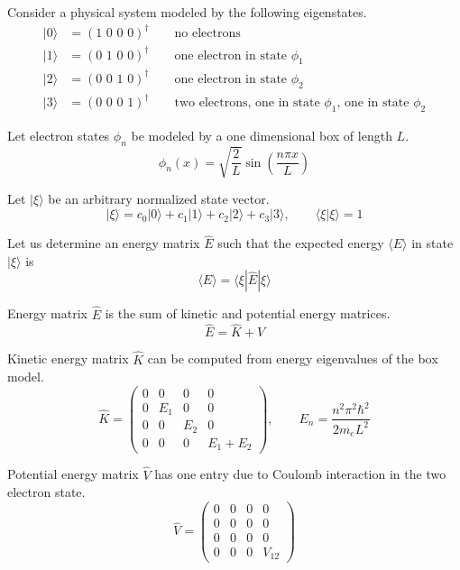 \documentclass[12pt]{article}
\begin{document}
\noindent
Consider a physical system modeled by the following eigenstates.
\begin{align*}
|0\rangle&=(\text{1 0 0 0})^\dag\qquad\text{no electrons}\\
|1\rangle&=(\text{0 1 0 0})^\dag\qquad\text{one electron in state $\phi_1$}\\
|2\rangle&=(\text{0 0 1 0})^\dag\qquad\text{one electron in state $\phi_2$}\\
|3\rangle&=(\text{0 0 0 1})^\dag\qquad\text{two electrons, one in state $\phi_1$, one in state $\phi_2$}
\end{align*}

\noindent
Let electron states $\phi_n$ be modeled by a one dimensional box of length $L$.
\begin{equation*}
\phi_n(x)=\sqrt{\frac{2}{L}}\sin\left(\frac{n\pi x}{L}\right)
\end{equation*}

\noindent
Let $|\xi\rangle$ be an arbitrary normalized state vector.
\begin{equation*}
|\xi\rangle=c_0|0\rangle+c_1|1\rangle+c_2|2\rangle+c_3|3\rangle,\qquad\langle\xi|\xi\rangle=1
\end{equation*}

\noindent
Let us determine an energy matrix $\hat{E}$ such that the expected
energy $\langle E \rangle$ in state $|\xi\rangle$ is
\begin{equation*}
\langle E\rangle=\langle\xi|\hat{E}|\xi\rangle
\end{equation*}

\noindent
Energy matrix $\hat{E}$ is the sum of kinetic and potential energy matrices.
\begin{equation*}
\hat{E}=\hat{K}+\hat{V}
\end{equation*}

\noindent
Kinetic energy matrix $\hat{K}$ can be computed from energy eigenvalues of the box model.
\begin{equation*}
\hat{K}=\begin{pmatrix}
0 & 0 & 0 & 0\\
0 & E_1 & 0 & 0\\
0 & 0 & E_2 & 0\\
0 & 0 & 0 & E_1+E_2
\end{pmatrix},
\qquad
E_n=\frac{n^2\pi^2\hbar^2}{2m_eL^2}
\end{equation*}

\noindent
Potential energy matrix $\hat{V}$ has one entry due to Coulomb interaction in the two electron state.
\begin{equation*}
\hat{V}=
\begin{pmatrix}
0 & 0 & 0 & 0\\
0 & 0 & 0 & 0\\
0 & 0 & 0 & 0\\
0 & 0 & 0 & V_{12}
\end{pmatrix}
\end{equation*}
\end{document}
